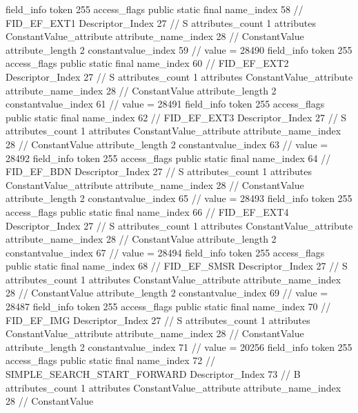 {{{{{{{				}
				}
			}
			field_info {
				token	255
				access_flags	public static final
				name_index	58		// FID_EF_EXT1
				Descriptor_Index	27		// S
				attributes_count	1
				attributes {
				ConstantValue_attribute {
					attribute_name_index	28		// ConstantValue
					attribute_length	2
					constantvalue_index	59		// value = 28490
				}
				}
			}
			field_info {
				token	255
				access_flags	public static final
				name_index	60		// FID_EF_EXT2
				Descriptor_Index	27		// S
				attributes_count	1
				attributes {
				ConstantValue_attribute {
					attribute_name_index	28		// ConstantValue
					attribute_length	2
					constantvalue_index	61		// value = 28491
				}
				}
			}
			field_info {
				token	255
				access_flags	public static final
				name_index	62		// FID_EF_EXT3
				Descriptor_Index	27		// S
				attributes_count	1
				attributes {
				ConstantValue_attribute {
					attribute_name_index	28		// ConstantValue
					attribute_length	2
					constantvalue_index	63		// value = 28492
				}
				}
			}
			field_info {
				token	255
				access_flags	public static final
				name_index	64		// FID_EF_BDN
				Descriptor_Index	27		// S
				attributes_count	1
				attributes {
				ConstantValue_attribute {
					attribute_name_index	28		// ConstantValue
					attribute_length	2
					constantvalue_index	65		// value = 28493
				}
				}
			}
			field_info {
				token	255
				access_flags	public static final
				name_index	66		// FID_EF_EXT4
				Descriptor_Index	27		// S
				attributes_count	1
				attributes {
				ConstantValue_attribute {
					attribute_name_index	28		// ConstantValue
					attribute_length	2
					constantvalue_index	67		// value = 28494
				}
				}
			}
			field_info {
				token	255
				access_flags	public static final
				name_index	68		// FID_EF_SMSR
				Descriptor_Index	27		// S
				attributes_count	1
				attributes {
				ConstantValue_attribute {
					attribute_name_index	28		// ConstantValue
					attribute_length	2
					constantvalue_index	69		// value = 28487
				}
				}
			}
			field_info {
				token	255
				access_flags	public static final
				name_index	70		// FID_EF_IMG
				Descriptor_Index	27		// S
				attributes_count	1
				attributes {
				ConstantValue_attribute {
					attribute_name_index	28		// ConstantValue
					attribute_length	2
					constantvalue_index	71		// value = 20256
				}
				}
			}
			field_info {
				token	255
				access_flags	public static final
				name_index	72		// SIMPLE_SEARCH_START_FORWARD
				Descriptor_Index	73		// B
				attributes_count	1
				attributes {
				ConstantValue_attribute {
					attribute_name_index	28		// ConstantValue
}}}}}}}
